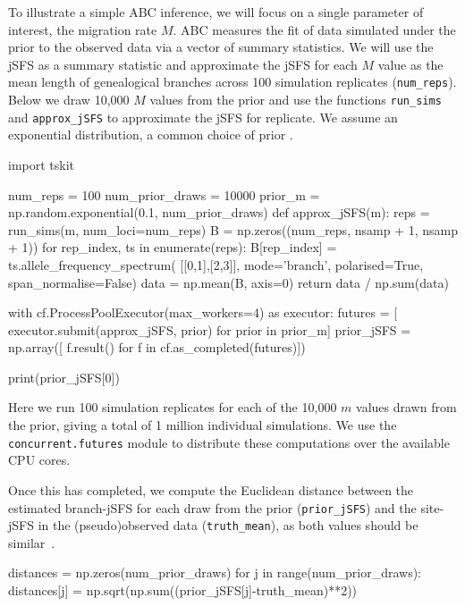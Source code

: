 \documentclass[graybox]{svmult}
\begin{document}
    To illustrate a simple ABC inference, we will focus on a single
parameter of interest, the migration rate \(M\).
ABC measures the fit of data simulated under the prior to the observed
data via a vector of summary statistics. We will use the jSFS as a
summary statistic and approximate the jSFS for each \(M\) value as the
mean length of genealogical branches across 100 simulation replicates (\texttt{num\_reps}). Below we
draw 10,000 \(M\) values from the prior and use the functions
\texttt{run\_sims} and \texttt{approx\_jSFS} to approximate the jSFS for
 replicate. We assume an exponential distribution, a common choice of prior \citep{hey2004multilocus}.

\begin{pythoncode}
import tskit

num_reps = 100
num_prior_draws = 10000
prior_m = np.random.exponential(0.1, num_prior_draws)
def approx_jSFS(m):
    reps = run_sims(m, num_loci=num_reps)
    B = np.zeros((num_reps, nsamp + 1, nsamp + 1))
    for rep_index, ts in enumerate(reps):
        B[rep_index] = ts.allele_frequency_spectrum(
            [[0,1],[2,3]], mode='branch',
            polarised=True, span_normalise=False)
    data = np.mean(B, axis=0)
    return data / np.sum(data)

with cf.ProcessPoolExecutor(max_workers=4) as executor:
    futures = [
        executor.submit(approx_jSFS, prior) for prior in prior_m]
    prior_jSFS = np.array([
        f.result() for f in cf.as_completed(futures)])

print(prior_jSFS[0])
\end{pythoncode}

Here we run 100 simulation replicates for each of the 10,000
$m$ values drawn from the prior, giving a total of 1 million individual simulations.
We use the \texttt{concurrent.futures} module to distribute these
computations over the available CPU cores.

Once this has completed, we compute the Euclidean distance between the estimated branch-jSFS for each
draw from the prior (\texttt{prior\_jSFS}) and the site-jSFS in the (pseudo)observed
data (\texttt{truth\_mean}), as both values should be similar~\citep{ralph_efficiently_2020}.
\begin{pythoncode}
distances = np.zeros(num_prior_draws)
for j in range(num_prior_draws):
    distances[j] = np.sqrt(np.sum((prior_jSFS[j]-truth_mean)**2))
\end{pythoncode}
\end{document}
